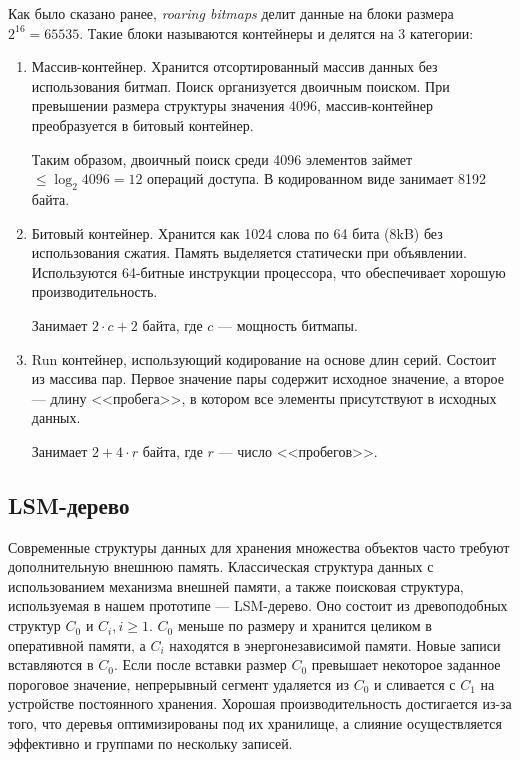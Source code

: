 Как было сказано ранее, \textit{roaring bitmaps} делит данные на блоки размера
$2^{16} = 65535$. Такие блоки называются контейнеры и делятся на 3 категории:
\begin{enumerate}
    \label{bitmap}
    \item Массив-контейнер. Хранится отсортированный массив данных без использования
    битмап. Поиск организуется двоичным поиском. При превышении размера структуры
    значения 4096, массив-контейнер преобразуется в битовый контейнер.

    Таким образом, двоичный поиск среди 4096 элементов займет $\leq \log_2{4096}
    = 12$ операций доступа. В кодированном виде занимает 8192 байта.
    \item Битовый контейнер. Хранится как 1024 слова по 64 бита (8kB) без
    использования сжатия. Память выделяется статически при объявлении. Используются
    64-битные инструкции процессора, что обеспечивает хорошую производительность.

    Занимает $2 \cdot c+2$ байта, где $c$ — мощность битмапы.
    \item Run контейнер, использующий кодирование на основе длин серий. Состоит
    из массива пар. Первое значение пары содержит исходное значение, а второе —
    длину <<пробега>>, в котором все элементы присутствуют в исходных данных.

    Занимает $2+4\cdot r$ байта, где $r$ — число <<пробегов>>.
\end{enumerate}

\subsection{LSM-дерево}

Современные структуры данных для хранения множества объектов часто требуют
дополнительную внешнюю память. Классическая структура данных с использованием механизма
внешней памяти, а также поисковая структура, используемая в нашем прототипе —
LSM-дерево. Оно состоит из древоподобных структур $C_0$ и $C_i, i \ge 1$.
$C_0$ меньше по размеру и хранится
целиком в оперативной памяти, а $C_i$ находятся в энергонезависимой памяти. Новые
записи вставляются в $C_0$. Если после вставки размер $C_0$ превышает некоторое заданное
пороговое значение, непрерывный сегмент удаляется из $C_0$ и сливается с $C_1$ на устройстве
постоянного хранения. Хорошая производительность достигается из-за того, что деревья
оптимизированы под их хранилище, а слияние осуществляется эффективно и группами по
нескольку записей.

